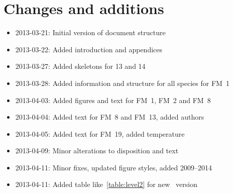 \chapter{Changes and additions}
\label{ch:changes}

\begin{itemize}
    \item 2013-03-21: Initial version of document structure
    \item 2013-03-22: Added introduction and appendices
    \item 2013-03-27: Added skeletons for 13 and 14
    \item 2013-03-28: Added information and structure for all species for FM~1
    \item 2013-04-03: Added figures and text for FM~1, FM~2 and FM~8
    \item 2013-04-04: Added text for FM~8 and FM~13, added authors
    \item 2013-04-05: Added text for FM~19, added temperature
    \item 2013-04-09: Minor alterations to disposition and text
    \item 2013-04-11: Minor fixes, updated figure styles, added 2009--2014
    \item 2013-04-11: Added table like~\ref{table:level2} for new \smr~version
\end{itemize}
